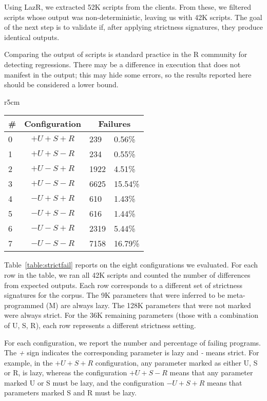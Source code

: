 \documentclass[review,creen,acmsmall]{acmart}
\newcommand{\lazr}{{\sf LazR}\xspace}
\begin{document}
Using \lazr, we extracted 52K scripts from the clients. From these, we filtered
scripts whose output was non-deterministic, leaving us with 42K scripts. The
goal of the next step is to validate if, after applying strictness signatures,
they produce identical outputs.

Comparing the output of scripts is standard practice in the R community for
detecting regressions. There may be a difference in execution that does not
manifest in the output; this may hide some errors, so the results reported here
should be considered a lower bound.

\begin{wraptable}{r}{5cm}
  \small
  \caption{Strictness Failure} \label{table:strictfail}
  \centering
  \begin{tabular}{lc|ll}
    \toprule
    \#&\textbf{Configuration}&\multicolumn{2}{c}{\textbf{Failures}}\\
    \midrule
    0&$+U+S+R$&239&0.56\%\\
    1&$+U+S-R$&234&0.55\%\\
    2&$+U-S+R$&1922&4.51\%\\
    3&$+U-S-R$&6625&15.54\%\\
    4&$-U+S+R$&610&1.43\%\\
    5&$-U+S-R$&616&1.44\%\\
    6&$-U-S+R$&2319&5.44\%\\
    7&$-U-S-R$&7158&16.79\%\\
    \bottomrule
  \end{tabular}
\end{wraptable}

Table~\ref{table:strictfail} reports on the eight configurations we evaluated.
For each row in the table, we ran all 42K scripts and counted the number of
differences from expected outputs. Each row corresponds to a different set of
strictness signatures for the corpus. The 9K parameters that were inferred to be
meta-programmed (M) are always lazy. The 128K parameters that were not marked
were always strict. For the 36K remaining parameters (those with a combination
of U, S, R), each row represents a different strictness setting.

For each configuration, we report the number and percentage of failing programs.
The \emph{+} sign indicates the corresponding parameter is lazy and \emph{-}
means strict. For example, in the $+U+S+R$ configuration, any parameter marked
as either U, S or R, is lazy, whereas the configuration $+U+S-R$ means that any
parameter marked U or S must be lazy, and the configuration $-U+S+R$ means that
parameters marked S and R must be lazy.
\end{document}
